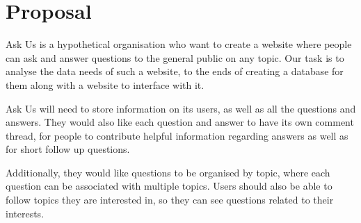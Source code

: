 \section{Proposal}

Ask Us is a hypothetical organisation who want to create a website where people can ask and answer questions to the general public on any topic. Our task is to analyse the data needs of such a website, to the ends of creating a database for them along with a website to interface with it.

Ask Us will need to store information on its users, as well as all the questions and answers. They would also like each question and answer to have its own comment thread, for people to contribute helpful information regarding answers as well as for short follow up questions.

Additionally, they would like questions to be organised by topic, where each question can be associated with multiple topics. Users should also be able to follow topics they are interested in, so they can see questions related to their interests.